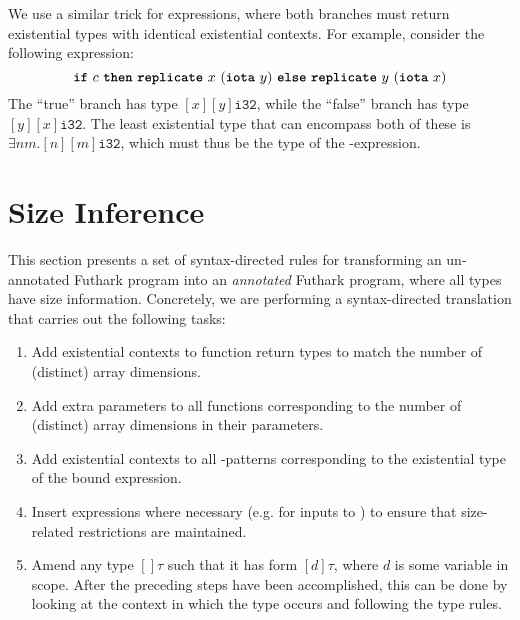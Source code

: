 We use a similar trick for  expressions, where both branches
must return existential types with identical existential contexts.
For example, consider the following expression:
\[
  \mbox{\texttt{\bfseries{if}}}~c~\mbox{\texttt{\bfseries{then}}}~\mbox{\texttt{\bfseries{replicate}}}~x~(\mbox{\texttt{\bfseries{iota}}}~y)~\mbox{\texttt{\bfseries{else}}}~\mbox{\texttt{\bfseries{replicate}}}~y~(\mbox{\texttt{\bfseries{iota}}}~x)
\]
The ``true'' branch has type $[x][y]\texttt{i32}$, while the ``false''
branch has type $[y][x]\texttt{i32}$.  The least existential type that
can encompass both of these is $\exists n m.[n][m]\texttt{i32}$, which
must thus be the type of the -expression.

\section{Size Inference}
\label{sec:size-inference}

\newcommand{\transformBnd}[1]{\mathcal{A}_{#1}^{\text{exp}}}
\newcommand{\transformFun}{\mathcal{A}^{\text{fun}}}
\newcommand{\transformLam}[1]{\mathcal{A}_{#1}^{\text{lam}}}
\newcommand{\head}{\textrm{head}}
\newcommand{\tail}{\textrm{tail}}
\newcommand{\drop}{\textrm{drop}}
\newcommand{\cons}[2]{#1 :: #2}

This section presents a set of syntax-directed rules for transforming
an un-annotated Futhark program into an \textit{annotated} Futhark
program, where all types have size information.  Concretely, we are
performing a syntax-directed translation that carries out the
following tasks:

\begin{enumerate}
\item Add existential contexts to function return types to match the
  number of (distinct) array dimensions.
\item Add extra parameters to all functions corresponding to the
  number of (distinct) array dimensions in their parameters.
\item Add existential contexts to all -patterns corresponding
  to the existential type of the bound expression.
\item Insert  expressions where necessary (e.g. for inputs
  to ) to ensure that size-related restrictions are
  maintained.
\item Amend any type $[]\tau$ such that it has form $[d]\tau$, where
  $d$ is some variable in scope.  After the preceding steps have been
  accomplished, this can be done by looking at the context in which
  the type occurs and following the type rules.
\end{enumerate}

